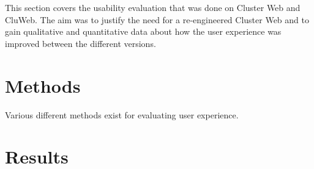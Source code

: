
This section covers the usability evaluation that was done on Cluster Web and CluWeb. The aim was to justify the need for a re-engineered Cluster Web and to gain qualitative and quantitative data about how the user experience was improved between the different versions.


\section{Methods}

Various different methods exist for evaluating user experience.

\section{Results}